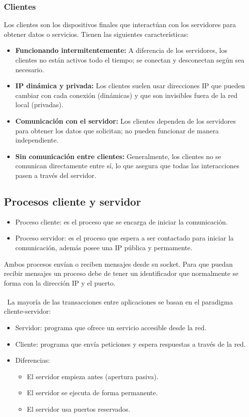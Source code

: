 \documentclass[a4paper,12pt]{article}
\begin{document}
\subsubsection{Clientes}

Los clientes son los dispositivos finales que interactúan con los servidores para obtener datos o servicios. Tienen las siguientes características:

\begin{itemize}
    \item \textbf{Funcionando intermitentemente:} A diferencia de los servidores, los clientes no están activos todo el tiempo; se conectan y desconectan según sea necesario.
    \item \textbf{IP dinámica y privada:} Los clientes suelen usar direcciones IP que pueden cambiar con cada conexión (dinámicas) y que son invisibles fuera de la red local (privadas).
    \item \textbf{Comunicación con el servidor:} Los clientes dependen de los servidores para obtener los datos que solicitan; no pueden funcionar de manera independiente.
    \item \textbf{Sin comunicación entre clientes:} Generalmente, los clientes no se comunican directamente entre sí, lo que asegura que todas las interacciones pasen a través del servidor.
\end{itemize}

\subsection{Procesos cliente y servidor}

\begin{itemize}
    \item Proceso cliente: es el proceso que se encarga de iniciar la comunicación.
    \item Proceso servidor: es el proceso que espera a ser contactado para iniciar la comunicación, además posee una IP pública y permamente.
\end{itemize}

Ambos procesos envían o reciben mensajes desde su socket. Para que puedan recibir mensajes un proceso debe de tener un identificador que normalmente se forma con la dirección IP y el puerto.\\\\\
La mayoría de las transacciones entre aplicaciones se basan en el paradigma cliente-servidor:
\begin{itemize}
    \item Servidor: programa que ofrece un servicio accesible desde la red.
    \item Cliente: programa que envía peticiones y espera respuestas a través de la red.
    \item Diferencias:
    \begin{itemize}
        \item El servidor empieza antes (apertura pasiva).
        \item El servidor se ejecuta de forma permanente.
        \item El servidor usa puertos reservados.   
    \end{itemize}
\end{itemize}
\end{document}
